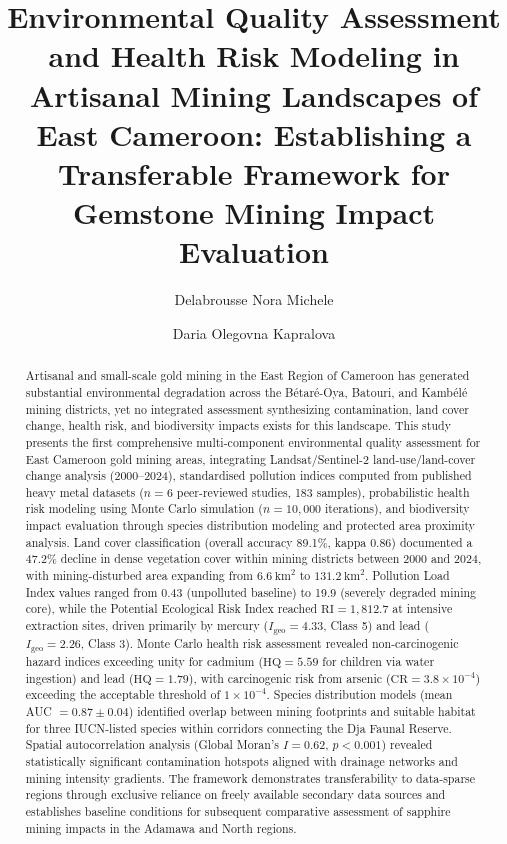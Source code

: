 \documentclass[preprint,12pt,number]{elsarticle}
\begin{document}
\begin{frontmatter}

\title{Environmental Quality Assessment and Health Risk Modeling in Artisanal Mining Landscapes of East Cameroon: Establishing a Transferable Framework for Gemstone Mining Impact Evaluation}

\author[1]{Delabrousse Nora Michele}
\author[2]{Daria Olegovna Kapralova}


\address[1]{Department of Environmental Sciences, University of Yaound\'{e} I, Yaound\'{e}, Cameroon}
\address[2]{Faculty of Geography, Lomonosov Moscow State University, Moscow, Russia}

\begin{abstract}
Artisanal and small-scale gold mining in the East Region of Cameroon has generated substantial environmental degradation across the B\'{e}tar\'{e}-Oya, Batouri, and Kamb\'{e}l\'{e} mining districts, yet no integrated assessment synthesizing contamination, land cover change, health risk, and biodiversity impacts exists for this landscape. This study presents the first comprehensive multi-component environmental quality assessment for East Cameroon gold mining areas, integrating Landsat/Sentinel-2 land-use/land-cover change analysis (2000--2024), standardised pollution indices computed from published heavy metal datasets ($n = 6$ peer-reviewed studies, 183 samples), probabilistic health risk modeling using Monte Carlo simulation ($n = 10{,}000$ iterations), and biodiversity impact evaluation through species distribution modeling and protected area proximity analysis. Land cover classification (overall accuracy 89.1\%, kappa 0.86) documented a 47.2\% decline in dense vegetation cover within mining districts between 2000 and 2024, with mining-disturbed area expanding from $6.6~\text{km}^{2}$ to $131.2~\text{km}^{2}$. Pollution Load Index values ranged from 0.43 (unpolluted baseline) to 19.9 (severely degraded mining core), while the Potential Ecological Risk Index reached $\text{RI} = 1{,}812.7$ at intensive extraction sites, driven primarily by mercury ($I_\text{geo} = 4.33$, Class 5) and lead ($I_\text{geo} = 2.26$, Class 3). Monte Carlo health risk assessment revealed non-carcinogenic hazard indices exceeding unity for cadmium ($\text{HQ} = 5.59$ for children via water ingestion) and lead ($\text{HQ} = 1.79$), with carcinogenic risk from arsenic ($\text{CR} = 3.8 \times 10^{-4}$) exceeding the acceptable threshold of $1 \times 10^{-4}$. Species distribution models (mean AUC $= 0.87 \pm 0.04$) identified overlap between mining footprints and suitable habitat for three IUCN-listed species within corridors connecting the Dja Faunal Reserve. Spatial autocorrelation analysis (Global Moran's $I = 0.62$, $p < 0.001$) revealed statistically significant contamination hotspots aligned with drainage networks and mining intensity gradients. The framework demonstrates transferability to data-sparse regions through exclusive reliance on freely available secondary data sources and establishes baseline conditions for subsequent comparative assessment of sapphire mining impacts in the Adamawa and North regions.

\end{abstract}
\end{frontmatter}
\end{document}
